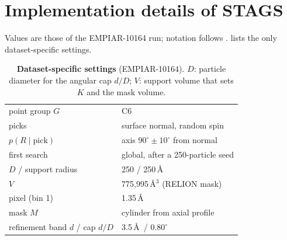 \section{Implementation details of STAGS}
\label{sec:suppl:method}

Values are those of the EMPIAR-10164 run; notation follows .
 lists the only dataset-specific settings.

\begin{table}[!htb]
\centering
\footnotesize
\caption{\textbf{Dataset-specific settings} (EMPIAR-10164). $D$: particle diameter for the angular cap $d/D$; $V$: support volume that sets $K$ and the mask volume.}
\label{tab:suppl:datasets}
\setlength{\tabcolsep}{3pt}
\begin{tabular}{@{}ll@{}}
\toprule
point group $G$ & C6 \\
picks & surface normal, random spin \\
$p(R\mid\text{pick})$ & axis $90^\circ\pm10^\circ$ from normal \\
first search & global, after a 250-particle seed \\
$D$ / support radius & 250 / 250\,\AA \\
$V$ & 775,995\,\AA$^3$ (RELION mask) \\
pixel (bin 1) & 1.35\,\AA \\
mask $M$ & cylinder from axial profile \\
refinement band $d$ / cap $d/D$ & 3.5\,\AA\ / $0.80^\circ$ \\
\bottomrule
\end{tabular}
\end{table}

